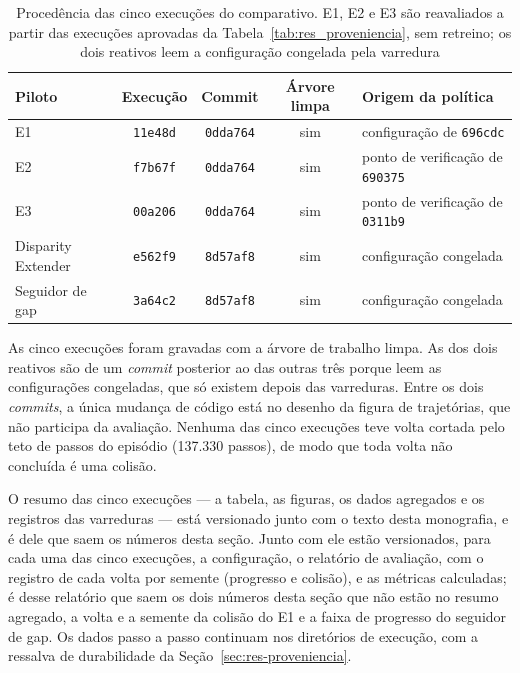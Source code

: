 \begin{table}[htb]
    \centering
    \footnotesize
    \begin{tabular}{|l|c|c|c|l|}
        \hline
        \textbf{Piloto} & \textbf{Execução} & \textbf{Commit} &
        \textbf{Árvore limpa} & \textbf{Origem da política} \\
        \hline
        E1 & \texttt{11e48d} & \texttt{0dda764} & sim & configuração de \texttt{696cdc} \\
        \hline
        E2 & \texttt{f7b67f} & \texttt{0dda764} & sim & ponto de verificação de \texttt{690375} \\
        \hline
        E3 & \texttt{00a206} & \texttt{0dda764} & sim & ponto de verificação de \texttt{0311b9} \\
        \hline
        Disparity Extender & \texttt{e562f9} & \texttt{8d57af8} & sim & configuração congelada \\
        \hline
        Seguidor de gap & \texttt{3a64c2} & \texttt{8d57af8} & sim & configuração congelada \\
        \hline
    \end{tabular}
    \caption{Procedência das cinco execuções do comparativo. E1, E2 e E3 são
    reavaliados a partir das execuções aprovadas da
    Tabela~\ref{tab:res_proveniencia}, sem retreino; os dois reativos leem a
    configuração congelada pela varredura}
    \label{tab:res_cmp_proveniencia}
\end{table}

As cinco execuções foram gravadas com a árvore de trabalho limpa. As dos dois
reativos são de um \textit{commit} posterior ao das outras três porque leem as
configurações congeladas, que só existem depois das varreduras. Entre os dois
\textit{commits}, a única mudança de código está no desenho da figura de
trajetórias, que não participa da avaliação. Nenhuma das cinco
execuções teve volta cortada pelo teto de passos do episódio (137.330 passos), de
modo que toda volta não concluída é uma colisão.

O resumo das cinco execuções --- a tabela, as figuras, os dados agregados e os
registros das varreduras --- está versionado junto com o texto desta monografia,
e é dele que saem os números desta seção. Junto com ele estão versionados, para
cada uma das cinco execuções, a configuração, o relatório de avaliação, com o
registro de cada volta por semente (progresso e colisão), e as métricas
calculadas; é desse relatório que saem os dois números desta seção que não estão
no resumo agregado, a volta e a semente da colisão do E1 e a faixa de progresso
do seguidor de gap. Os dados passo a passo continuam nos diretórios de execução,
com a ressalva de durabilidade da Seção~\ref{sec:res-proveniencia}.

